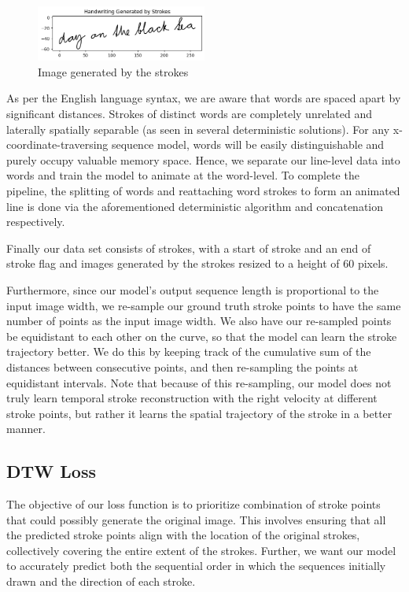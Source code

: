 \documentclass[10pt,twocolumn,letterpaper]{article}
\begin{document}
\begin{figure}
    \centering
    \includegraphics[width=0.5\textwidth]{latex-src/Images/Stroke_Generated.png}
    \caption{Image generated by the strokes}
    \label{fig:stkgenl}
\end{figure}

As per the English language syntax, we are aware that words are spaced apart by significant distances. Strokes of distinct words are completely unrelated and laterally spatially separable (as seen in several deterministic solutions). For any x-coordinate-traversing sequence model, words will be easily distinguishable and purely occupy valuable memory space. Hence, we separate our line-level data into words and train the model to animate at the word-level. To complete the pipeline, the splitting of words and reattaching word strokes to form an animated line is done via the aforementioned deterministic algorithm and concatenation respectively.

Finally our data set consists of strokes, with a start of stroke and an end of stroke flag and images generated by the strokes resized to a height of 60 pixels. 

Furthermore, since our model's output sequence length is proportional to the input image width, we re-sample our ground truth stroke points to have the same number of points as the input image width. We also have our re-sampled points be equidistant to each other on the curve, so that the model can learn the stroke trajectory better. We do this by keeping track of the cumulative sum of the distances between consecutive points, and then re-sampling the points at equidistant intervals. Note that because of this re-sampling, our model does not truly learn temporal stroke reconstruction with the right velocity at different stroke points, but rather it learns the spatial trajectory of the stroke in a better manner.

\subsection{DTW Loss}


The objective of our loss function is to prioritize combination of stroke points that could possibly generate the original image. This involves ensuring that all the predicted stroke points align with the location of the original strokes, collectively covering the entire extent of the strokes. Further, we want our model to accurately predict both the sequential order in which the sequences initially drawn and the direction of each stroke. 
\end{document}
